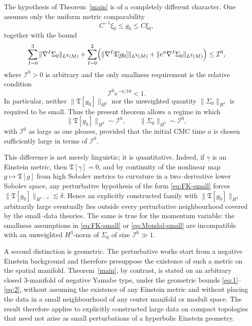 \documentclass{amsart}
\begin{document}
\noindent The hypothesis of Theorem~\ref{main} is of a completely different character.  One assumes
only the uniform metric comparability
\[
C^{-1}\xi_{0}\leq g_{0}\leq C\xi_{0},
\]
together with the bound
\begin{equation}
\label{eq:main-large}
\sum_{I=0}^{3}\|\nabla^{I}\Sigma_{0}\|_{L^{2}(M)}
+\sum_{I=0}^{2}\Bigl(\|\nabla^{I}\mathfrak T[g_{0}]\|_{L^{2}(M)}
+\|e^{a}\nabla^{I}\Sigma_{0}\|_{L^{2}(M)}\Bigr)
\leq \mathcal I^{0},
\end{equation}
where \(\mathcal I^{0}>0\) is arbitrary and the only smallness requirement is the relative
condition
\[
\mathcal I^{0}e^{-a/10}<1.
\]
In particular, neither \(\|\mathfrak T[g_{0}]\|_{H^{2}}\) nor the unweighted quantity
\(\|\Sigma_{0}\|_{H^{3}}\) is required to be small.  Thus the present theorem allows a regime
in which
\[
\|\mathfrak T[g_{0}]\|_{H^{2}}\sim \mathcal I^{0},
\qquad
\|\Sigma_{0}\|_{H^{3}}\sim \mathcal I^{0},
\]
with \(\mathcal I^{0}\) as large as one pleases, provided that the initial CMC time \(a\) is
chosen sufficiently large in terms of \(\mathcal I^{0}\).

\noindent This difference is not merely linguistic; it is quantitative.  Indeed, if \(\gamma\) is an
Einstein metric, then \(\mathfrak T[\gamma]=0\), and by continuity of the nonlinear map
\(g\mapsto \mathfrak T[g]\) from high Sobolev metrics to curvature in a two--derivative lower
Sobolev space, any perturbative hypothesis of the form \eqref{eq:FK-small} forces
\(\|\mathfrak T[g_{0}]\|_{H^{s'-2}}\lesssim \delta\).  Hence an explicitly constructed family with
\(\|\mathfrak T[g_{0}]\|_{H^{2}}\) arbitrarily large eventually lies outside every perturbative
neighbourhood covered by the small--data theories.  The same is true for the momentum
variable: the smallness assumptions in \eqref{eq:FK-small} or \eqref{eq:Mondal-small}
are incompatible with an unweighted \(H^{3}\)-norm of \(\Sigma_{0}\) of size \(\mathcal I^{0}\gg1\).

\noindent A second distinction is geometric.  The perturbative works start from a negative Einstein
background and therefore presuppose the existence of such a metric on the spatial
manifold.  Theorem~\ref{main}, by contrast, is stated on an arbitrary closed
\(3\)-manifold of negative Yamabe type, under the geometric bounds
\eqref{eq:1}--\eqref{eq:2}, without assuming the existence of any Einstein metric and
without placing the data in a small neighbourhood of any center manifold or moduli
space.  The result therefore applies to explicitly constructed large data on compact
topologies that need not arise as small perturbations of a hyperbolic Einstein geometry.
\end{document}
